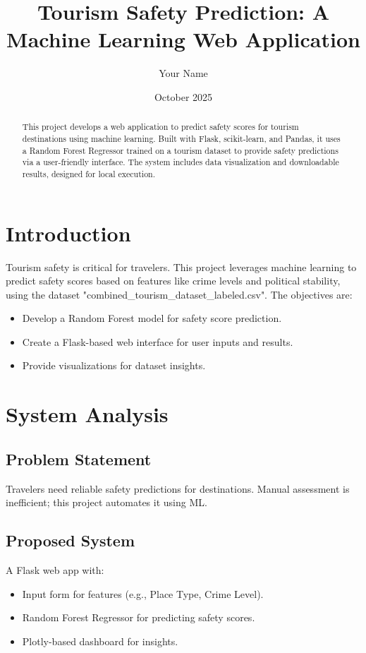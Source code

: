 \documentclass[a4paper,12pt]{article}
\begin{document}
\title{Tourism Safety Prediction: A Machine Learning Web Application}
\author{Your Name}
\date{October 2025}
\maketitle

\begin{abstract}
This project develops a web application to predict safety scores for tourism destinations using machine learning. Built with Flask, scikit-learn, and Pandas, it uses a Random Forest Regressor trained on a tourism dataset to provide safety predictions via a user-friendly interface. The system includes data visualization and downloadable results, designed for local execution.
\end{abstract}

\section{Introduction}
Tourism safety is critical for travelers. This project leverages machine learning to predict safety scores based on features like crime levels and political stability, using the dataset "combined_tourism_dataset_labeled.csv". The objectives are:
\begin{itemize}
    \item Develop a Random Forest model for safety score prediction.
    \item Create a Flask-based web interface for user inputs and results.
    \item Provide visualizations for dataset insights.
\end{itemize}

\section{System Analysis}
\subsection{Problem Statement}
Travelers need reliable safety predictions for destinations. Manual assessment is inefficient; this project automates it using ML.

\subsection{Proposed System}
A Flask web app with:
\begin{itemize}
    \item Input form for features (e.g., Place Type, Crime Level).
    \item Random Forest Regressor for predicting safety scores.
    \item Plotly-based dashboard for insights.
\end{itemize}
\end{document}
